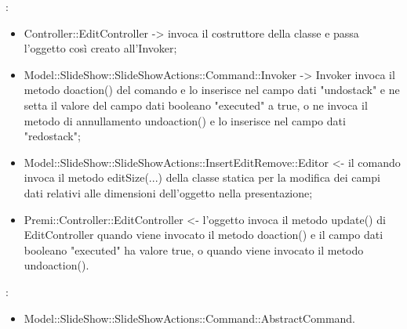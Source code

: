 {{				\textbf{\relaz}: 
				\begin{itemize}
					\item Controller::\-EditController -> invoca il costruttore della classe e passa l’oggetto così creato all’Invoker;
					\item Model::\-SlideShow::\-SlideShowActions::\-Command::\-Invoker -> Invoker invoca il metodo doaction() del comando e lo inserisce nel campo dati "undostack" e ne setta il valore del campo dati booleano "executed" a true, o ne invoca il metodo di annullamento undoaction() e lo inserisce nel campo dati "redostack";
                    \item Model::\-SlideShow::\-SlideShowActions::\-InsertEditRemove::\-Editor <- il comando invoca il metodo editSize(...) della classe statica per la modifica dei campi dati relativi alle dimensioni dell'oggetto nella presentazione;
                    \item Premi::\-Controller::\-EditController <- l'oggetto invoca il metodo update() di EditController quando viene invocato il metodo doaction() e il campo dati booleano "executed" ha valore true, o quando viene invocato il metodo undoaction().
				\end{itemize}	
                \textbf{\base}: 
                    \begin{itemize}
                    \item Model::\-SlideShow::\-SlideShowActions::\-Command::\-AbstractCommand.
                    \end{itemize}
                    }
                    }
